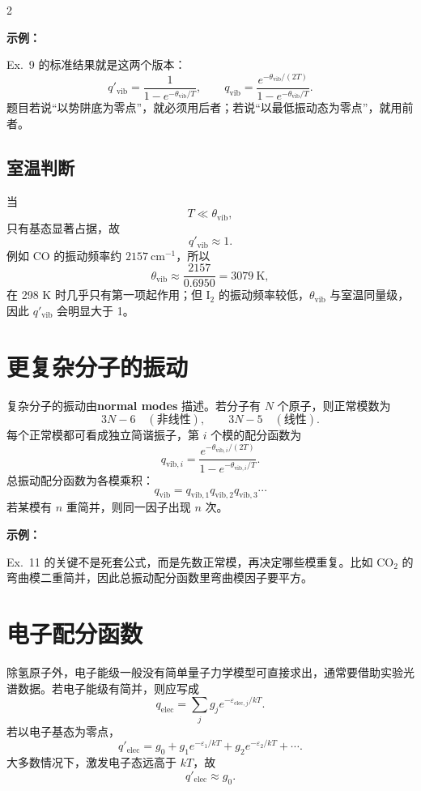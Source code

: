 \documentclass[a4paper,9pt]{article}
\newenvironment{examplebox}
{\par\vspace{0.3em}\noindent\begin{tcolorbox}[colback=boxbg,colframe=derivcolor,boxrule=0.5pt,arc=2pt,left=2pt,right=2pt,top=2pt,bottom=2pt,boxsep=0pt]\scriptsize\noindent\textcolor{derivcolor}{\textbf{示例：}}\par\setlength{\parskip}{0.1ex}\setlength{\itemsep}{0pt}\setlength{\parsep}{0pt}}
{\end{tcolorbox}\par\vspace{0.3em}}
\begin{document}
\begin{multicols}{2}
	\begin{examplebox}
		Ex.~9 的标准结果就是这两个版本：
		\[
			q'_{\mathrm{vib}}=\frac{1}{1-e^{-\theta_{\mathrm{vib}}/T}},
			\qquad
			q_{\mathrm{vib}}=\frac{e^{-\theta_{\mathrm{vib}}/(2T)}}{1-e^{-\theta_{\mathrm{vib}}/T}}.
		\]
		题目若说“以势阱底为零点”，就必须用后者；若说“以最低振动态为零点”，就用前者。
	\end{examplebox}

	\subsection{室温判断}
	当
	\[
		T\ll\theta_{\mathrm{vib}},
	\]
	只有基态显著占据，故
	\[
		q'_{\mathrm{vib}}\approx 1.
	\]
	例如 CO 的振动频率约 $2157\ \mathrm{cm^{-1}}$，所以
	\[
		\theta_{\mathrm{vib}}\approx \frac{2157}{0.6950}=3079\ \mathrm K,
	\]
	在 298 K 时几乎只有第一项起作用；但 I$_2$ 的振动频率较低，$\theta_{\mathrm{vib}}$ 与室温同量级，因此 $q'_{\mathrm{vib}}$ 会明显大于 1。

	\section{更复杂分子的振动}

	复杂分子的振动由\textbf{normal modes} 描述。若分子有 $N$ 个原子，则正常模数为
	\[
		3N-6\quad (\text{非线性}),
		\qquad
		3N-5\quad (\text{线性}).
	\]
	每个正常模都可看成独立简谐振子，第 $i$ 个模的配分函数为
	\[
		q_{\mathrm{vib},i}=\frac{e^{-\theta_{\mathrm{vib},i}/(2T)}}{1-e^{-\theta_{\mathrm{vib},i}/T}}.
	\]
	总振动配分函数为各模乘积：
	\[
		q_{\mathrm{vib}}=q_{\mathrm{vib},1}q_{\mathrm{vib},2}q_{\mathrm{vib},3}\cdots
	\]
	若某模有 $n$ 重简并，则同一因子出现 $n$ 次。

	\begin{examplebox}
		Ex.~11 的关键不是死套公式，而是先数正常模，再决定哪些模重复。比如 CO$_2$ 的弯曲模二重简并，因此总振动配分函数里弯曲模因子要平方。
	\end{examplebox}

	\section{电子配分函数}

	除氢原子外，电子能级一般没有简单量子力学模型可直接求出，通常要借助实验光谱数据。若电子能级有简并，则应写成
	\[
		q_{\mathrm{elec}}=\sum_j g_j e^{-\varepsilon_{\mathrm{elec},j}/kT}.
	\]
	若以电子基态为零点，
	\[
		q'_{\mathrm{elec}}=g_0+g_1 e^{-\varepsilon_{1}/kT}+g_2 e^{-\varepsilon_{2}/kT}+\cdots.
	\]
	大多数情况下，激发电子态远高于 $kT$，故
	\[
		q'_{\mathrm{elec}}\approx g_0.
	\]


\end{multicols}
\end{document}
